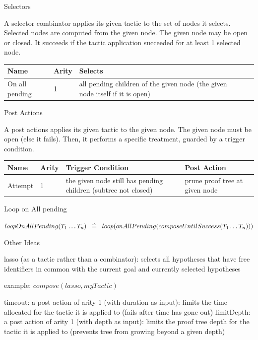 Selectors

A selector combinator applies its given tactic to the set of nodes it selects. Selected nodes are computed from the given node. The given node may be open or closed. It succeeds if the tactic application succeeded for at least 1 selected node. 

\begin{center}
    \begin{tabular}{ | l | l | l | p{5cm} |}
    \hline
	Name & Arity & Selects \\ \hline
	On all pending  & 1 & all pending children of the given node (the given node itself if it is open) \\ \hline
    \end{tabular}
\end{center}

Post Actions

A post actions applies its given tactic to the given node. The given node must be open (else it fails). Then, it performs a specific treatment, guarded by a trigger condition. 

\begin{center}
    \begin{tabular}{ | l | l | l | l | p{5cm} |}
    \hline
	Name & Arity & Trigger Condition & Post Action \\ \hline
	Attempt & 1 & the given node still has pending children (subtree not closed) & prune proof tree at given node  \\ \hline
    \end{tabular}
\end{center}

Loop on All pending

$loopOnAllPending(T_1 \ldots T_n) \;\;\mathrel{\widehat=}\;\; loop(onAllPending(composeUntilSuccess(T_1 \ldots T_n)))  $

Other Ideas

    lasso (as a tactic rather than a combinator): selects all hypotheses that have free identifiers in common with the current goal and currently selected hypotheses 

    example: $compose(lasso, myTactic)$ 

    timeout: a post action of arity 1 (with duration as input): limits the time allocated for the tactic it is applied to (fails after time has gone out)
    limitDepth: a post action of arity 1 (with depth as input): limits the proof tree depth for the tactic it is applied to (prevents tree from growing beyond a given depth) 

